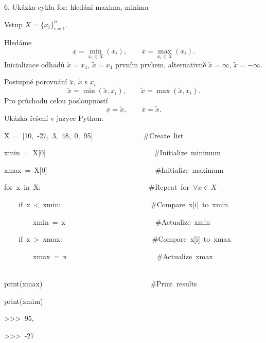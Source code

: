 \documentclass[czech]{beamer}
\newenvironment{lyxcode}
  {\par\begin{list}{}{
    \setlength{\rightmargin}{\leftmargin}
    \setlength{\listparindent}{0pt}%
    \raggedright
    \setlength{\itemsep}{0pt}
    \setlength{\parsep}{0pt}
    \normalfont\ttfamily}%
   \def\{{\char`\{}
   \def\}{\char`\}}
   \def\textasciitilde{\char`\~}
   \item[]}
  {\end{list}}
\begin{document}
\begin{frame}[plain]{6. Ukázka cyklu for: hledání maxima, minima}

{\scriptsize Vstup $X=\{x_{i}\}_{i=1}^{n}.$}{\scriptsize\par}

{\scriptsize Hledáme
\[
\underline{x}=\min_{x_{i}\in X}(x_{i}),\qquad\overline{x}=\max_{x_{i}\in X}(x_{i}).
\]
Inicializace odhadů $\utilde{x}=x_{1}$, $\widetilde{x}=x_{1}$ prvním
prvkem, alternativně $\utilde{x}=\infty$, $\widetilde{x}=-\infty$.}{\scriptsize\par}

{\scriptsize Postupné porovnání $\utilde{x}$, $\widetilde{x}$ s $x_{i}$
\[
\utilde{x}=\min(\utilde{x},x_{i}),\qquad\widetilde{x}=\max(\widetilde{x},x_{i}).
\]
Pro průchodu celou posloupností 
\[
\underline{x}=\utilde{x},\qquad\overline{x}=\widetilde{x}.
\]
Ukázka řešení v jazyce Python:}{\scriptsize\par}
\begin{lyxcode}
{\scriptsize X~=~{[}10,~-27,~3,~48,~0,~95{]}~~~~~~~~~~~~~~\#Create~list}{\scriptsize\par}

{\scriptsize xmin~=~X{[}0{]}~~~~~~~~~~~~~~~~~~~~~~~~~~~~~~\#Initialize~minimum}{\scriptsize\par}

{\scriptsize xmax~=~X{[}0{]}~~~~~~~~~~~~~~~~~~~~~~~~~~~~~~\#Initialize~maximum}{\scriptsize\par}

{\scriptsize for~x~in~X:~~~~~~~~~~~~~~~~~~~~~~~~~~~~~~\#Repeat~for~$\forall x\in X$}{\scriptsize\par}

{\scriptsize ~~~~if~x~<~xmin:~~~~~~~~~~~~~~~~~~~~~~~~~\#Compare~x{[}i{]}~to~xmin}{\scriptsize\par}

{\scriptsize ~~~~~~~~xmin~=~x~~~~~~~~~~~~~~~~~~~~~~~~~\#Actualize~xmin}{\scriptsize\par}

{\scriptsize ~~~~if~x~>~xmax:~~~~~~~~~~~~~~~~~~~~~~~~~\#Compare~x{[}i{]}~to~xmax}{\scriptsize\par}

{\scriptsize ~~~~~~~~xmax~=~x~~~~~~~~~~~~~~~~~~~~~~~~~\#Actualize~xmax~~~~~~~~~~~~~~~~~~~~~~~~~~~~~~~~~~}{\scriptsize\par}

{\scriptsize print(xmax)~~~~~~~~~~~~~~~~~~~~~~~~~~~~~~\#Print~results}{\scriptsize\par}

{\scriptsize print(xmim)~~}{\scriptsize\par}

{\scriptsize >\textcompwordmark >\textcompwordmark >~95,~}{\scriptsize\par}

{\scriptsize >\textcompwordmark >\textcompwordmark >~-27}{\scriptsize\par}
\end{lyxcode}
\end{frame}
\end{document}
